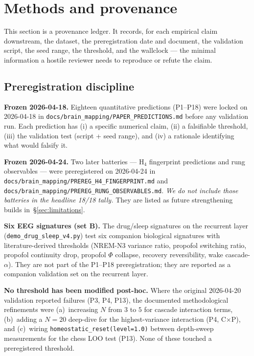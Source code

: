 \section{Methods and provenance}\label{sec:method}

This section is a provenance ledger. It records, for each empirical
claim downstream, the dataset, the preregistration date and document,
the validation script, the seed range, the threshold, and the
wallclock — the minimal information a hostile reviewer needs to
reproduce or refute the claim.

\subsection{Preregistration discipline}

\textbf{Frozen 2026-04-18.} Eighteen quantitative predictions
(P1--P18) were locked on 2026-04-18 in
\texttt{docs/brain\_mapping/PAPER\_PREDICTIONS.md} before any validation
run. Each prediction has (i) a specific numerical claim, (ii) a
falsifiable threshold, (iii) the validation test (script + seed range),
and (iv) a rationale identifying what would falsify it.

\textbf{Frozen 2026-04-24.} Two later batteries — H$_4$ fingerprint
predictions and rung observables — were preregistered on 2026-04-24
in \texttt{docs/brain\_mapping/PREREG\_H4\_FINGERPRINT.md} and
\texttt{docs/brain\_mapping/PREREG\_RUNG\_OBSERVABLES.md}. \emph{We do
not include those batteries in the headline 18/18 tally.} They are
listed as future strengthening builds in~\S\ref{sec:limitations}.

\textbf{Six EEG signatures (set B).} The drug/sleep signatures on the
recurrent layer (\texttt{demo\_drug\_sleep\_v4.py}) test six companion
biological signatures with literature-derived thresholds (NREM-N3
variance ratio, propofol switching ratio, propofol continuity drop,
propofol $\Phi$ collapse, recovery reversibility, wake
cascade-$\alpha$). They are not part of the P1--P18 preregistration;
they are reported as a companion validation set on the recurrent
layer.

\textbf{No threshold has been modified post-hoc.} Where the original
2026-04-20 validation reported failures (P3, P4, P13), the documented
methodological refinements were
(a)~increasing $N$ from $3$ to $5$ for cascade interaction terms,
(b)~adding a $N\!=\!20$ deep-dive for the highest-variance interaction
(P4, C$\times$P), and
(c)~wiring \texttt{homeostatic\_reset(level=1.0)} between depth-sweep
measurements for the chess LOO test (P13). None of these touched a
preregistered threshold.

